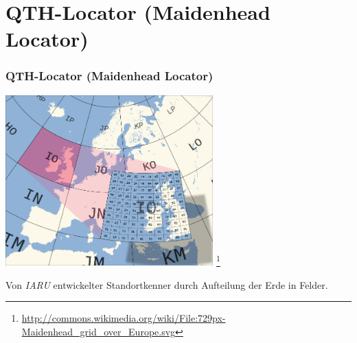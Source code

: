 \section[QTH-Locator]{QTH-Locator (Maidenhead Locator)}

\begin{frame}
    \frametitle{QTH-Locator (Maidenhead Locator)}

    \begin{center}
        \includegraphics[width=0.6\textwidth,height=.65\textheight,keepaspectratio]{bv11/Maidenhead_grid_over_Europe.png}
        \footnote{\tiny \url{http://commons.wikimedia.org/wiki/File:729px-Maidenhead_grid_over_Europe.svg}}
    \end{center}

    Von \emph{IARU} entwickelter Standortkenner durch Aufteilung der Erde in Felder.

\end{frame}


